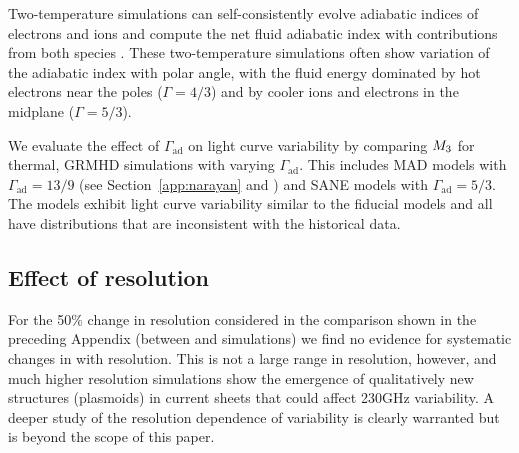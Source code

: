 Two-temperature simulations can self-consistently evolve adiabatic indices of electrons and ions and compute the net fluid adiabatic index with contributions from both species \citep{10.1093/mnras/stw3116}.
These two-temperature simulations often show variation of the adiabatic index with polar angle, with the fluid energy dominated by hot electrons near the poles ($\Gamma = 4/3$) and by cooler ions and  electrons in the midplane ($\Gamma=5/3$).

We evaluate the effect of $\Gamma_\mathrm{ad}$ on light curve variability by comparing $M_{3}$ for thermal, GRMHD simulations with varying  $\Gamma_\mathrm{ad}$.
This includes MAD models with $\Gamma_\mathrm{ad}=13/9$ (see Section~\ref{app:narayan} and  \citealt{2022MNRAS.511.3795N}) and SANE models with $\Gamma_\mathrm{ad}=5/3$.
The models exhibit light curve variability similar to the fiducial models and all have  distributions that are inconsistent with the historical data.

\subsection{Effect of resolution}

For the 50\% change in resolution considered in the comparison shown in the preceding Appendix (between \kharma and \bhac simulations) we find no
evidence for systematic changes in  with resolution.  This is not a large
range in resolution, however, and much higher resolution simulations \citep{2022ApJ...924L..32R, 2020ApJ...900..100R, 2021arXiv211103689N}
show the emergence of qualitatively
new structures (plasmoids) in current sheets that could affect 230GHz variability.
A deeper study of the resolution dependence of variability is clearly warranted
but is beyond the scope of this paper.

